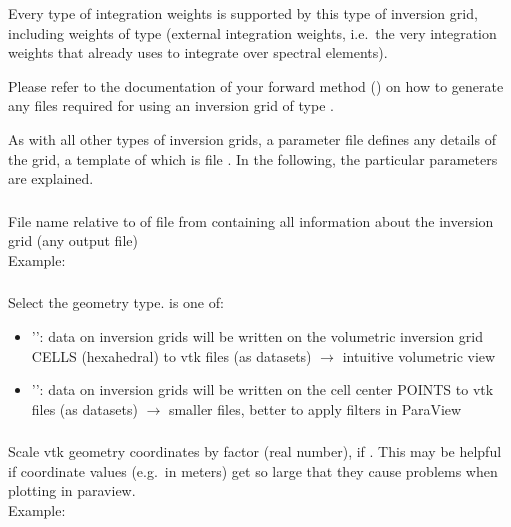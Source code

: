 Every type of integration weights is supported by this type of inversion grid, including weights of type 
 (external integration weights, i.e.\ the very integration weights that already 
uses to integrate over spectral elements).

Please refer to the documentation of your  forward method ()
on how to generate any files required for using an inversion grid of type .

As with all other types of inversion grids, a parameter file defines any details of the grid, a template 
of which is file .
In the following, the particular parameters are explained.

\subsubsection{}
File name relative to  of file from 
containing all information about the inversion grid (any  output file)\\
Example:\\
\subsubsection{}
Select the geometry type.  is one of:
\begin{itemize}
\item[]'': data on inversion grids will be written on the volumetric inversion grid CELLS (hexahedral) to vtk files (as  datasets) $\rightarrow$ intuitive volumetric view
\item[]'': data on inversion grids will be written on the cell center POINTS to vtk files (as  datasets) $\rightarrow$ smaller files, better to apply filters in ParaView
\end{itemize}
\subsubsection{}
Scale vtk geometry coordinates by factor  (real number), if 
. This may be helpful if coordinate values (e.g.\ in meters) 
get so large that they cause problems when plotting in paraview.\\
Example:\\
\\
